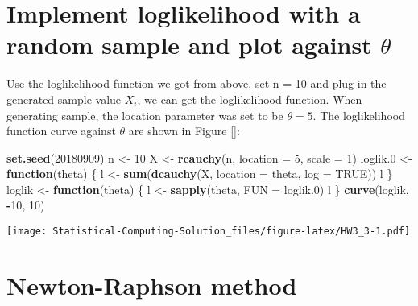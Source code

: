\documentclass[]{book}
\newenvironment{Shaded}{\begin{snugshade}}{\end{snugshade}}
\newcommand{\KeywordTok}[1]{\textcolor[rgb]{0.13,0.29,0.53}{\textbf{#1}}}
\newcommand{\DataTypeTok}[1]{\textcolor[rgb]{0.13,0.29,0.53}{#1}}
\newcommand{\DecValTok}[1]{\textcolor[rgb]{0.00,0.00,0.81}{#1}}
\newcommand{\StringTok}[1]{\textcolor[rgb]{0.31,0.60,0.02}{#1}}
\newcommand{\OtherTok}[1]{\textcolor[rgb]{0.56,0.35,0.01}{#1}}
\newcommand{\ControlFlowTok}[1]{\textcolor[rgb]{0.13,0.29,0.53}{\textbf{#1}}}
\newcommand{\OperatorTok}[1]{\textcolor[rgb]{0.81,0.36,0.00}{\textbf{#1}}}
\newcommand{\NormalTok}[1]{#1}
\theoremstyle{definition}
\theoremstyle{definition}
\theoremstyle{definition}
\theoremstyle{remark}
\begin{document}
\section{\texorpdfstring{Implement loglikelihood with a random sample
and plot against
\(\theta\)}{Implement loglikelihood with a random sample and plot against \textbackslash{}theta}}\label{implement-loglikelihood-with-a-random-sample-and-plot-against-theta}

Use the loglikelihood function we got from above, set n = 10 and plug in
the generated sample value \(X_i\), we can get the loglikelihood
function. When generating sample, the location parameter was set to be
\(\theta = 5\). The loglikelihood function curve against \(\theta\) are
shown in Figure \ref{}:

\begin{Shaded}
\begin{Highlighting}[]
\KeywordTok{set.seed}\NormalTok{(}\DecValTok{20180909}\NormalTok{)}
\NormalTok{n <-}\StringTok{ }\DecValTok{10}
\NormalTok{X <-}\StringTok{ }\KeywordTok{rcauchy}\NormalTok{(n, }\DataTypeTok{location =} \DecValTok{5}\NormalTok{, }\DataTypeTok{scale =} \DecValTok{1}\NormalTok{)}
\NormalTok{loglik.}\DecValTok{0}\NormalTok{ <-}\StringTok{ }\ControlFlowTok{function}\NormalTok{(theta) \{}
\NormalTok{  l <-}\StringTok{ }\KeywordTok{sum}\NormalTok{(}\KeywordTok{dcauchy}\NormalTok{(X, }\DataTypeTok{location =}\NormalTok{ theta, }\DataTypeTok{log =} \OtherTok{TRUE}\NormalTok{))}
\NormalTok{  l}
\NormalTok{\}}
\NormalTok{loglik <-}\StringTok{ }\ControlFlowTok{function}\NormalTok{(theta) \{}
\NormalTok{  l <-}\StringTok{ }\KeywordTok{sapply}\NormalTok{(theta, }\DataTypeTok{FUN =}\NormalTok{ loglik.}\DecValTok{0}\NormalTok{)}
\NormalTok{  l}
\NormalTok{\}}
\KeywordTok{curve}\NormalTok{(loglik, }\OperatorTok{-}\DecValTok{10}\NormalTok{, }\DecValTok{10}\NormalTok{)}
\end{Highlighting}
\end{Shaded}

\texttt{[image: Statistical-Computing-Solution\_files/figure-latex/HW3\_3-1.pdf]}

\section{Newton-Raphson method}\label{newton-raphson-method}
\end{document}
